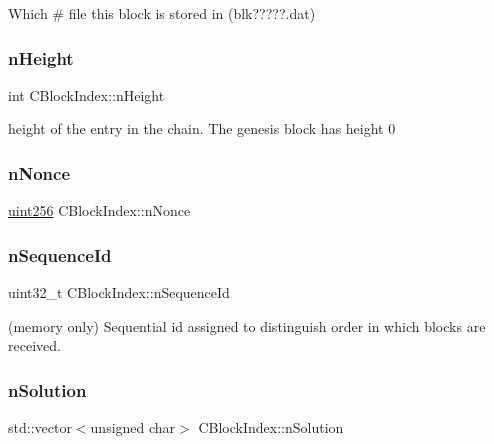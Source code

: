 Which \# file this block is stored in (blk?????.dat) 

\mbox{\label{class_c_block_index_aebfc8d6b95852546760e742553d7bfd5}} 
\subsubsection{\texorpdfstring{n\+Height}{nHeight}}
{\footnotesize\ttfamily int C\+Block\+Index\+::n\+Height}



height of the entry in the chain. The genesis block has height 0 

\mbox{\label{class_c_block_index_a6cd6b15ad3a4cc502aeebfab8ec9e4d6}} 
\subsubsection{\texorpdfstring{n\+Nonce}{nNonce}}
{\footnotesize\ttfamily \mbox{\hyperlink{classuint256}{uint256}} C\+Block\+Index\+::n\+Nonce}

\mbox{\label{class_c_block_index_a4a679af5f7924cc594b8131371b21e54}} 
\subsubsection{\texorpdfstring{n\+Sequence\+Id}{nSequenceId}}
{\footnotesize\ttfamily uint32\+\_\+t C\+Block\+Index\+::n\+Sequence\+Id}



(memory only) Sequential id assigned to distinguish order in which blocks are received. 

\mbox{\label{class_c_block_index_afc393de336d759ed0e1fafd48470f437}} 
\subsubsection{\texorpdfstring{n\+Solution}{nSolution}}
{\footnotesize\ttfamily std\+::vector$<$unsigned char$>$ C\+Block\+Index\+::n\+Solution}

